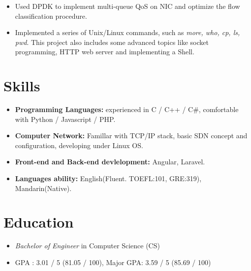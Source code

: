 \documentclass{resume}
\begin{document}
\begin{itemize}
  \item Used DPDK to implement multi-queue QoS on NIC and optimize the flow classification procedure.
\end{itemize}

\begin{itemize}
  \item Implemented a series of Unix/Linux commands, such as \textit{more, who, cp, ls, pwd}. This project also includes some advanced topics like socket programming, HTTP web server and implementing a Shell.
\end{itemize}

\section{Skills}
\begin{itemize}[parsep=0.5ex]
  \item \textbf{Programming Languages:} experienced in C / C++ / C\#, comfortable with Python / Javascript / PHP.
  \item \textbf{Computer Network:} Famillar with TCP/IP stack, basic SDN concept and configuration, developing under Linux OS.
  \item \textbf{Front-end and Back-end devlelopment:} Angular, Laravel.
  \item \textbf{Languages ability:} English(Fluent. TOEFL:101, GRE:319), Mandarin(Native).
\end{itemize}

\section{Education}
\begin{itemize}
  \item \textit{Bachelor of Engineer} in Computer Science (CS)
  \item GPA : 3.01 / 5 (81.05 / 100), Major GPA: 3.59 / 5 (85.69 / 100)
\end{itemize}

%
%
\end{document}
